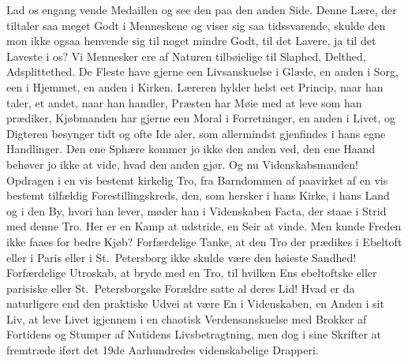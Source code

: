 Lad os engang vende Medaillen og see den paa den anden Side. Denne
Lære, der tiltaler saa meget Godt i Menneskene og viser sig saa
tidssvarende, skulde den mon ikke ogsaa henvende sig til noget mindre Godt,
til det Lavere, ja til det Laveste i os? Vi Mennesker ere af Naturen
tilbøielige til Slaphed, Delthed, Adsplittethed. De Fleste have gjerne een
Livsanskuelse i Glæde, en anden i Sorg, een i Hjemmet, en anden i Kirken.
Læreren hylder helst eet Princip, naar han taler, et andet, naar han handler,
Præsten har Møie med at leve som han prædiker, Kjøbmanden har gjerne een
Moral i Forretninger, en anden i Livet, og Digteren besynger tidt og ofte
Ide%
aler, som allermindst gjenfindes i hans egne Handlinger. Den ene
Sphære kommer jo ikke den anden ved, den ene Haand behøver jo ikke at vide,
hvad den anden gjør. Og nu Videnskabsmanden! Opdragen i en vis bestemt
kirkelig Tro, fra Barndommen af paavirket af en vis bestemt tilfældig
Forestillingskreds, den, som hersker i hans Kirke, i hans Land og i den By,
hvori han lever, møder han i Videnskaben Facta, der staae i Strid med denne
Tro. Her er en Kamp at udstride, en Seir at vinde. Men kunde Freden ikke
faaes for bedre Kjøb? Forfærdelige Tanke, at den Tro der prædikes i Ebeltoft
eller i Paris eller i St.\ Petersborg ikke skulde være den høieste Sandhed!
Forfærdelige Utroskab, at bryde med en Tro, til hvilken Ens ebeltoftske eller
parisiske eller St.\ Petersborgske Forældre satte al deres Lid! Hvad er da
naturligere end den praktiske Udvei at være En i Videnskaben, en Anden i sit
Liv, at leve Livet igjennem i en chaotisk Verdensanskuelse med Brokker af
Fortidens og Stumper af Nutidens Livsbetragtning, men dog i sine Skrifter at
fremtræde iført det 19de Aarhundredes videnskabelige Drapperi.

